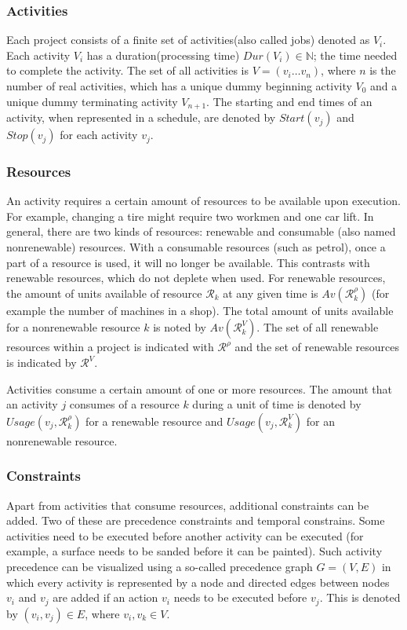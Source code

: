 \documentclass{article}
\begin{document}
\subsubsection{Activities}
Each project consists of a finite set of activities(also called jobs) denoted as $V_i$. Each activity $V_i$ has a duration(processing time) $Dur(V_i) \in \mathbb{N}$; the time needed to complete the activity. The set of all activities is $V = (v_i \ldots v_n)$, where $n$ is the number of real activities, which has a unique dummy beginning activity $V_0$ and a unique dummy terminating activity $V_{n+1}$. The starting and end times of an activity, when represented in a schedule, are denoted by $Start(v_j)$ and $Stop(v_j)$ for each activity $v_j$.

\subsubsection{Resources}
An activity requires a certain amount of resources to be available upon execution. For example, changing a tire might require two workmen and one car lift. In general, there are two kinds of resources: renewable and consumable (also named nonrenewable) resources. With a consumable resources (such as petrol), once a part of a resource is used, it will no longer be available. This contrasts with renewable resources, which do not deplete when used. For renewable resources, the amount of units available of resource $\mathcal{R}_k$ at any given time is $Av(\mathcal{R}^{\rho}_k)$ (for example the number of machines in a shop). The total amount of units available for a nonrenewable resource $k$ is noted by $Av(\mathcal{R}^{V}_k)$. The set of all renewable resources within a project is indicated with $\mathcal{R}^{\rho}$ and the set of renewable resources is indicated by $\mathcal{R}^{V}$. 

Activities consume a certain amount of one or more resources. The amount that an activity $j$ consumes of a resource $k$ during a unit of time is denoted by $Usage(v_j, \mathcal{R}^{\rho}_k)$ for a renewable resource and   $Usage(v_j, \mathcal{R}^V_k)$ for an nonrenewable resource. 

\subsubsection{Constraints}
Apart from activities that consume resources, additional constraints can be added. Two of these are precedence constraints and temporal constrains. Some activities need to be executed before another activity can be executed (for example, a surface needs to be sanded before it can be painted). Such activity precedence can be visualized using a so-called precedence graph $G = (V, E)$ in which every activity is represented by a node and directed edges between nodes $v_i$ and $v_j$ are added if an action $v_i$ needs to be executed before $v_j$. This is denoted by $(v_i,v_j) \in E$, where $v_i, v_k \in V$.
\end{document}
